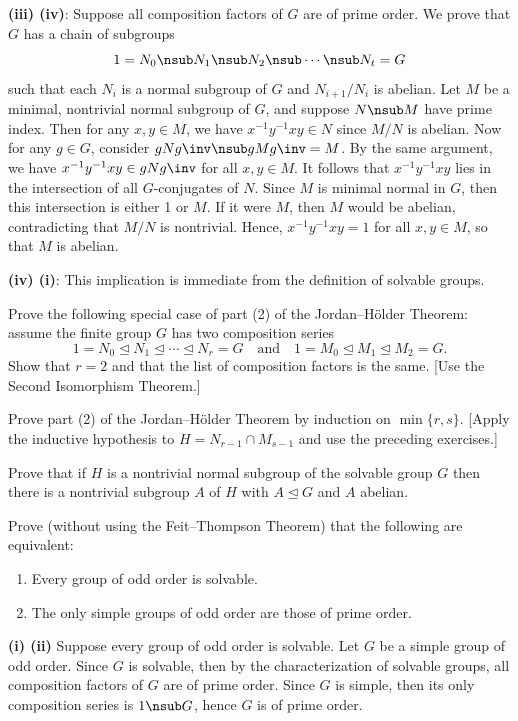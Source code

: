 \begin{problems}
\begin{sol}
        \textbf{(iii) \rightimp (iv)}: Suppose all composition factors of $G$ are of prime order. We prove that $G$ has a chain of subgroups
        \[1 = N_0 \nsub N_1 \nsub N_2 \nsub \cdots \nsub N_t = G\]
        such that each $N_i$ is a normal subgroup of $G$ and $N_{i + 1}/N_i$ is abelian. Let $M$ be a minimal, nontrivial normal subgroup of $G$, and suppose $N \nsub M$ have prime index. Then for any $x, y \in M$, we have $x^{-1}y^{-1}xy \in N$ since $M/N$ is abelian. Now for any $g \in G$, consider $gNg\inv \nsub gMg\inv = M$. By the same argument, we have $x^{-1}y^{-1}xy \in gNg\inv$ for all $x, y \in M$. It follows that $x^{-1}y^{-1}xy$ lies in the intersection of all $G$-conjugates of $N$. Since $M$ is minimal normal in $G$, then this intersection is either 1 or $M$. If it were $M$, then $M$ would be abelian, contradicting that $M/N$ is nontrivial. Hence, $x^{-1}y^{-1}xy = 1$ for all $x, y \in M$, so that $M$ is abelian.

        \textbf{(iv) \rightimp (i)}: This implication is immediate from the definition of solvable groups.
    \end{sol}
    \item Prove the following special case of part (2) of the Jordan--H\"older Theorem: assume the finite group $G$ has two composition series
    \[ 1 = N_0 \trianglelefteq N_1 \trianglelefteq \cdots \trianglelefteq N_r = G \quad\text{and}\quad 1 = M_0 \trianglelefteq M_1 \trianglelefteq M_2 = G. \]
    Show that $r = 2$ and that the list of composition factors is the same.
    [Use the Second Isomorphism Theorem.]
    \begin{sol}
        
    \end{sol}
    \item Prove part (2) of the Jordan--H\"older Theorem by induction on $\min\{r,s\}$. [Apply the inductive hypothesis to $H = N_{r-1} \cap M_{s-1}$ and use the preceding exercises.]

    \item Prove that if $H$ is a nontrivial normal subgroup of the solvable group $G$ then there is a nontrivial subgroup $A$ of $H$ with $A \trianglelefteq G$ and $A$ abelian.

    \item Prove (without using the Feit--Thompson Theorem) that the following are equivalent:
    \begin{enumerate}
    \item[(i)] Every group of odd order is solvable.
    \item[(ii)] The only simple groups of odd order are those of prime order.
    \end{enumerate}
    \begin{sol}
        \textbf{(i) \rightimp (ii)} Suppose every group of odd order is solvable. Let $G$ be a simple group of odd order. Since $G$ is solvable, then by the characterization of solvable groups, all composition factors of $G$ are of prime order. Since $G$ is simple, then its only composition series is $1 \nsub G$, hence $G$ is of prime order.


\end{sol}
\end{problems}
